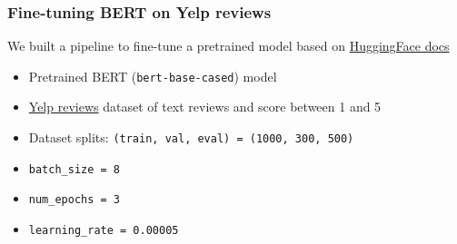 \begin{frame}
\frametitle{Fine-tuning BERT on Yelp reviews}
We built a pipeline to fine-tune a pretrained model based on \href{https://huggingface.co/docs/transformers/training#train-in-native-pytorch}{\color{blue}HuggingFace docs}
\begin{itemize}
    \item Pretrained BERT (\texttt{bert-base-cased}) model
    \item \href{https://huggingface.co/datasets/yelp_review_full}{\color{blue}Yelp reviews} dataset of text reviews and score between 1 and 5
    \item Dataset splits: \texttt{(train, val, eval) = (1000, 300, 500)}
\end{itemize}
\begin{itemize}
    \item<2-> \texttt{batch\_size = 8}
    \item<2-> \texttt{num\_epochs = 3}
    \item<2-> \texttt{learning\_rate = 0.00005}
\end{itemize}
\end{frame}
